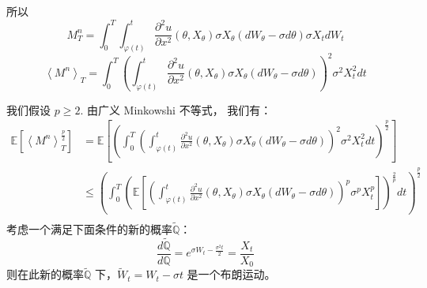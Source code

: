 所以
\begin{equation}
M_T^n=\int_0^T\int_{\varphi(t)}^t \frac{\partial^2 u}{\partial x^2}(\theta, X_\theta)\sigma X_\theta (dW_\theta-\sigma d\theta)\sigma X_t dW_t
\end{equation}
\begin{equation}
\left \langle M^n \right \rangle_T=\int_0^T(\int_{\varphi(t)}^t \frac{\partial^2 u}{\partial x^2}(\theta, X_\theta)\sigma X_\theta (dW_\theta-\sigma d\theta))^2\sigma^2 X_t^2 dt
\end{equation}

我们假设 $p\geq 2$. 由广义 Minkowshi 不等式， 我们有：
\begin{equation}
\begin{split} 
\mathbb{E}[\left \langle M^n \right \rangle_T^{\frac{p}{2}}]
&=\mathbb{E}[(\int_0^T(\int_{\varphi(t)}^t \frac{\partial^2 u}{\partial x^2}(\theta, X_\theta)\sigma X_\theta (dW_\theta-\sigma d\theta))^2\sigma^2 X_t^2 dt)^{\frac{p}{2}}]\\
&\leq (\int_0^T(\mathbb{E}[(\int_{\varphi(t)}^t \frac{\partial^2 u}{\partial x^2}(\theta, X_\theta)\sigma X_\theta (dW_\theta-\sigma d\theta))^p\sigma^p X_t^p] )^{\frac{2}{p}}dt)^{\frac{p}{2}}\\
\end{split}
\end{equation}
考虑一个满足下面条件的新的概率$\widetilde{\mathbb{Q}}$： 
\begin{equation}
\frac{d\widetilde{\mathbb{Q}}}{d\mathbb{Q}}=e^{\sigma W_t-\frac{\sigma^2t}{2}}=\frac{X_t}{X_0}
\end{equation}
则在此新的概率$\widetilde{\mathbb{Q}}$ 下，$\widetilde{W}_t=W_t-\sigma t$ 是一个布朗运动。

